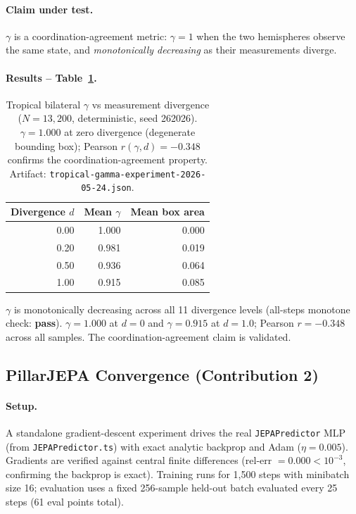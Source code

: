 \paragraph{Claim under test.}
$\gamma$ is a coordination-agreement metric: $\gamma = 1$ when the two
hemispheres observe the same state, and \emph{monotonically decreasing} as
their measurements diverge.

\paragraph{Results -- Table~\ref{tab:tropical-gamma}.}

\begin{table}[h]
\centering
\caption{Tropical bilateral $\gamma$ vs measurement divergence ($N = 13{,}200$,
  deterministic, seed 262026).  $\gamma = 1.000$ at zero divergence (degenerate
  bounding box); Pearson $r(\gamma, d) = -0.348$ confirms the
  coordination-agreement property.
  Artifact: \texttt{tropical-gamma-experiment-2026-05-24.json}.}
\label{tab:tropical-gamma}
\begin{tabular}{rrr}
\toprule
Divergence $d$ & Mean $\gamma$ & Mean box area \\
\midrule
0.00 & 1.000 & 0.000 \\
0.20 & 0.981 & 0.019 \\
0.50 & 0.936 & 0.064 \\
1.00 & 0.915 & 0.085 \\
\bottomrule
\end{tabular}
\end{table}

\noindent
$\gamma$ is monotonically decreasing across all 11 divergence levels
(all-steps monotone check: \textbf{pass}).  $\gamma = 1.000$ at $d = 0$
and $\gamma = 0.915$ at $d = 1.0$; Pearson $r = -0.348$ across all samples.
The coordination-agreement claim is validated.

\subsection{PillarJEPA Convergence (Contribution 2)}
\label{sec:eval-jepa-convergence}

\paragraph{Setup.}
A standalone gradient-descent experiment drives the real \texttt{JEPAPredictor}
MLP (from \texttt{JEPAPredictor.ts}) with exact analytic backprop and Adam
($\eta = 0.005$).  Gradients are verified against central finite differences
(rel-err $= 0.000 < 10^{-3}$, confirming the backprop is exact).  Training
runs for 1,500 steps with minibatch size 16; evaluation uses a fixed 256-sample
held-out batch evaluated every 25 steps (61 eval points total).

